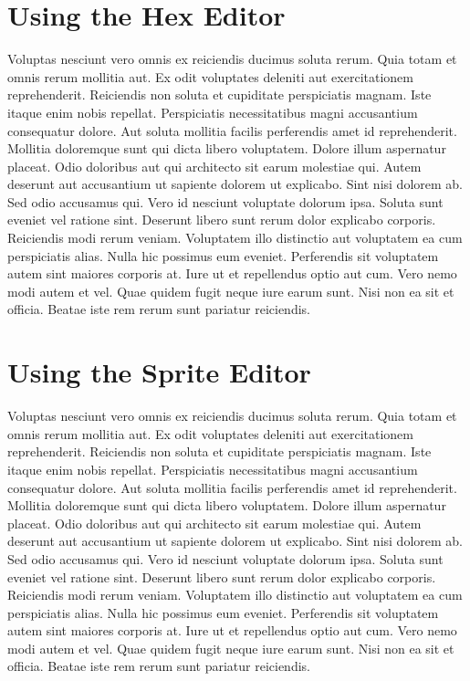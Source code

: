 \documentclass[
	11pt, %
	fleqn, %
	letterpaper, %
]{CommodoreBlueBook}
\begin{document}
\chapter*{Using the Hex Editor}

Voluptas nesciunt vero omnis ex reiciendis ducimus soluta rerum. Quia totam et
omnis rerum mollitia aut. Ex odit voluptates deleniti aut exercitationem
reprehenderit. Reiciendis non soluta et cupiditate perspiciatis magnam. Iste
itaque enim nobis repellat. Perspiciatis necessitatibus magni accusantium
consequatur dolore. Aut soluta mollitia facilis perferendis amet id
reprehenderit. Mollitia doloremque sunt qui dicta libero voluptatem. Dolore
illum aspernatur placeat. Odio doloribus aut qui architecto sit earum molestiae
qui. Autem deserunt aut accusantium ut sapiente dolorem ut explicabo. Sint nisi
dolorem ab. Sed odio accusamus qui. Vero id nesciunt voluptate dolorum ipsa.
Soluta sunt eveniet vel ratione sint. Deserunt libero sunt rerum dolor
explicabo corporis. Reiciendis modi rerum veniam. Voluptatem illo distinctio
aut voluptatem ea cum perspiciatis alias. Nulla hic possimus eum eveniet.
Perferendis sit voluptatem autem sint maiores corporis at. Iure ut et
repellendus optio aut cum. Vero nemo modi autem et vel. Quae quidem fugit neque
iure earum sunt. Nisi non ea sit et officia. Beatae iste rem rerum sunt
pariatur reiciendis.

\chapter*{Using the Sprite Editor}

Voluptas nesciunt vero omnis ex reiciendis ducimus soluta rerum. Quia totam et
omnis rerum mollitia aut. Ex odit voluptates deleniti aut exercitationem
reprehenderit. Reiciendis non soluta et cupiditate perspiciatis magnam. Iste
itaque enim nobis repellat. Perspiciatis necessitatibus magni accusantium
consequatur dolore. Aut soluta mollitia facilis perferendis amet id
reprehenderit. Mollitia doloremque sunt qui dicta libero voluptatem. Dolore
illum aspernatur placeat. Odio doloribus aut qui architecto sit earum molestiae
qui. Autem deserunt aut accusantium ut sapiente dolorem ut explicabo. Sint nisi
dolorem ab. Sed odio accusamus qui. Vero id nesciunt voluptate dolorum ipsa.
Soluta sunt eveniet vel ratione sint. Deserunt libero sunt rerum dolor
explicabo corporis. Reiciendis modi rerum veniam. Voluptatem illo distinctio
aut voluptatem ea cum perspiciatis alias. Nulla hic possimus eum eveniet.
Perferendis sit voluptatem autem sint maiores corporis at. Iure ut et
repellendus optio aut cum. Vero nemo modi autem et vel. Quae quidem fugit neque
iure earum sunt. Nisi non ea sit et officia. Beatae iste rem rerum sunt
pariatur reiciendis.
\end{document}
